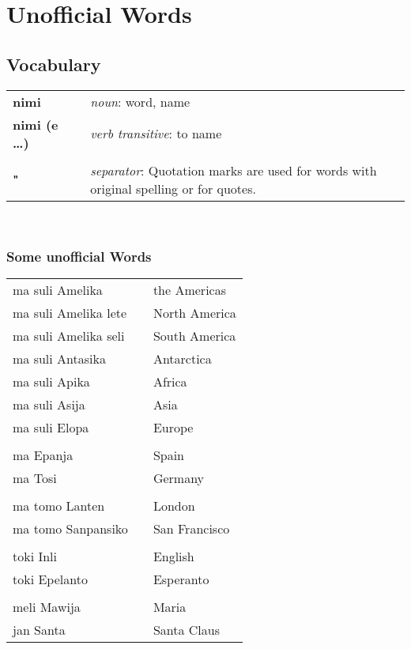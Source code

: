 \section{Unofficial Words} 
%
\subsection*{Vocabulary}
%
\begin{supertabular}{p{2,5cm}|ll}
%
\textbf{nimi} && \textit{noun}: word, name \\ %
\textbf{nimi (e \dots )} && \textit{verb transitive}: to name \\ %
 && \\ %
%
\textbf{"} && \textit{separator}: Quotation marks are used for words with original spelling or for quotes. \\ %
\end{supertabular} \\

\subsubsection*{Some unofficial Words}

\begin{supertabular}{p{2,5cm}|ll}
ma suli Amelika && the Americas \\
ma suli Amelika lete && North America \\
ma suli Amelika seli && South America \\
ma suli Antasika && Antarctica \\
ma suli Apika && Africa \\
ma suli Asija && Asia \\
ma suli Elopa && Europe \\
 && \\ %
ma Epanja && Spain \\
ma Tosi && Germany \\
 && \\ %
ma tomo Lanten && London \\ 
ma tomo Sanpansiko && San Francisco \\
 && \\ %
toki Inli  && English \\
toki Epelanto && Esperanto \\
 && \\ %
meli Mawija && Maria \\
jan Santa && Santa Claus \\
\end{supertabular}
%
%
\newpage
%
